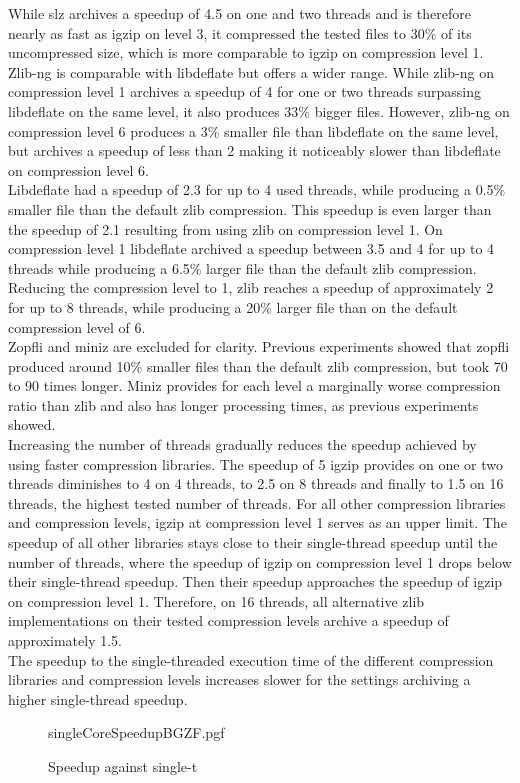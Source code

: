 While slz archives a speedup of 4.5 on one and two threads  and is therefore nearly as fast as igzip on level 3, it compressed the tested files to 30\% of its uncompressed size, which is more comparable to igzip on compression level 1. \\
Zlib-ng is comparable with libdeflate but offers a wider range. While zlib-ng on compression level 1 archives a speedup of 4 for one or two threads surpassing libdeflate on the same level, it also produces 33\% bigger files. However, zlib-ng on compression level 6 produces a 3\% smaller file than libdeflate on the same level, but archives a speedup of less than 2 making it noticeably slower than libdeflate on compression level 6. \\
Libdeflate had a speedup of 2.3 for up to 4 used threads, while producing a 0.5\% smaller file than the default zlib compression. This speedup is even larger than the speedup of 2.1 resulting from using zlib on compression level 1. On compression level 1 libdeflate archived a speedup between 3.5 and 4 for up to 4 threads while producing a 6.5\% larger file than the default zlib compression. \\
Reducing the compression level to 1, zlib reaches a speedup of approximately 2 for up to 8 threads, while producing a 20\% larger file than on the default compression level of 6. \\
Zopfli and miniz are excluded for clarity. Previous experiments showed that zopfli produced around 10\% smaller files than the default zlib compression, but took 70 to 90 times longer.   
Miniz provides for each level a marginally worse compression ratio than zlib and also has longer processing times, as previous experiments showed. \\

Increasing the number of threads gradually reduces the speedup achieved by using faster compression libraries. The speedup of 5 igzip provides on one or two threads diminishes to 4 on 4 threads, to 2.5 on 8 threads and finally to 1.5 on 16 threads, the highest tested number of threads. For all other compression libraries and compression levels, igzip at compression level 1 serves as an upper limit. The speedup of all other libraries stays close to their single-thread speedup until the number of threads, where the speedup of igzip on compression level 1 drops below their single-thread speedup. Then their speedup approaches the speedup of igzip on compression level 1. Therefore, on 16 threads, all alternative zlib implementations on their tested compression levels archive a speedup of approximately 1.5. \\
The speedup to the single-threaded execution time of the different compression libraries and compression levels increases slower for the settings archiving a higher single-thread speedup. 
\begin{figure}[t]
        {singleCoreSpeedupBGZF.pgf}
    \caption{Speedup against single-t}
    \label{fig:decomp}
\end{figure}

